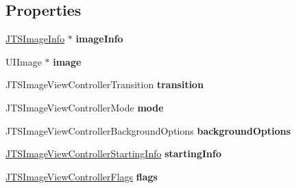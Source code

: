 \subsection*{Properties}
\begin{DoxyCompactItemize}
\item 
\hypertarget{category_j_t_s_image_view_controller_07_08_a427793941d1a12b31d080097b35c2c1d}{}\hyperlink{interface_j_t_s_image_info}{J\+T\+S\+Image\+Info} $\ast$ {\bfseries image\+Info}\label{category_j_t_s_image_view_controller_07_08_a427793941d1a12b31d080097b35c2c1d}

\item 
\hypertarget{category_j_t_s_image_view_controller_07_08_a9033099f640680edbe2092102aaf2628}{}U\+I\+Image $\ast$ {\bfseries image}\label{category_j_t_s_image_view_controller_07_08_a9033099f640680edbe2092102aaf2628}

\item 
\hypertarget{category_j_t_s_image_view_controller_07_08_a802188d3f64e58e317e771a903dce72f}{}J\+T\+S\+Image\+View\+Controller\+Transition {\bfseries transition}\label{category_j_t_s_image_view_controller_07_08_a802188d3f64e58e317e771a903dce72f}

\item 
\hypertarget{category_j_t_s_image_view_controller_07_08_a6a0498acd7394c18079d12ac5fe409fd}{}J\+T\+S\+Image\+View\+Controller\+Mode {\bfseries mode}\label{category_j_t_s_image_view_controller_07_08_a6a0498acd7394c18079d12ac5fe409fd}

\item 
\hypertarget{category_j_t_s_image_view_controller_07_08_a81689235a231bcbd75aeebd01ca899df}{}J\+T\+S\+Image\+View\+Controller\+Background\+Options {\bfseries background\+Options}\label{category_j_t_s_image_view_controller_07_08_a81689235a231bcbd75aeebd01ca899df}

\item 
\hypertarget{category_j_t_s_image_view_controller_07_08_a088f41b0015f5fbea2042218e3d1116b}{}\hyperlink{struct_j_t_s_image_view_controller_starting_info}{J\+T\+S\+Image\+View\+Controller\+Starting\+Info} {\bfseries starting\+Info}\label{category_j_t_s_image_view_controller_07_08_a088f41b0015f5fbea2042218e3d1116b}

\item 
\hypertarget{category_j_t_s_image_view_controller_07_08_a0192207fa35230b6f21ce8ab212a7e0e}{}\hyperlink{struct_j_t_s_image_view_controller_flags}{J\+T\+S\+Image\+View\+Controller\+Flags} {\bfseries flags}\label{category_j_t_s_image_view_controller_07_08_a0192207fa35230b6f21ce8ab212a7e0e}


\end{DoxyCompactItemize}

